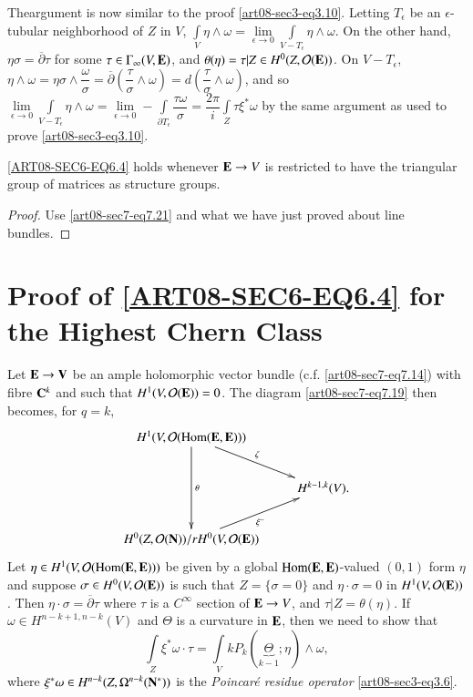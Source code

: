 The\pageoriginale argument is now similar to the proof \eqref{art08-sec3-eq3.10}. Letting $T_{\epsilon}$ be an $\epsilon$-tubular neighborhood of $Z$ in $V$, $\int\limits_{V}\eta\wedge \omega=\lim\limits_{\epsilon\to 0}\int\limits_{V-T_{\epsilon}}\eta\wedge \omega$. On the other hand, $\eta\sigma=\overline{\partial}\tau$ for some $\tau\in \Gamma_{\infty}(V,\mathbf{E})$, and $\theta(\eta)=\tau|Z\in H^{0}(Z,\mathcal{O}(\mathbf{E}))$. On $V-T_{\epsilon}$, $\eta\wedge \omega=\eta\sigma\wedge\dfrac{\omega}{\sigma}=\overline{\partial}\left(\dfrac{\tau}{\sigma}\wedge\omega\right)=d\left(\dfrac{\tau}{\sigma}\wedge\omega\right)$, and so $\lim\limits_{\epsilon\to 0}\int\limits_{V-T_{\epsilon}}\eta\wedge\omega=\lim\limits_{\epsilon\to 0}-\int\limits_{\partial T_{\epsilon}}\dfrac{\tau\omega}{\sigma}=\dfrac{2\pi}{i}\int\limits_{Z}\tau\xi^{*}\omega$ by the same argument as used to prove \eqref{art08-sec3-eq3.10}.

\setcounter{theorem}{26}
\begin{corollary}
\eqref{ART08-SEC6-EQ6.4} holds whenever $\mathbf{E}\to V$ is restricted to have the triangular group of matrices as structure groups.
\end{corollary}

\begin{proof}
Use \eqref{art08-sec7-eq7.21} and what we have just proved about line bundles.
\end{proof}

\section{Proof of \texorpdfstring{\eqref{ART08-SEC6-EQ6.4}}{eq6.4} for the Highest Chern Class}\label{art08-sec8}

Let $\mathbf{E}\to \mathbf{V}$ be an ample holomorphic vector bundle (c.f. \eqref{art08-sec7-eq7.14}) with fibre $\mathbf{C}^{k}$ and such that $H^{1}(V,\mathcal{O}(\mathbf{E}))=0$. The diagram \eqref{art08-sec7-eq7.19} then becomes, for $q=k$,
\setcounter{equation}{0}
\begin{equation}
\vcenter{\xymatrix{
H^{1}(V,\mathcal{O}(\Hom(\bfE,\bfE)))\ar[dd]^-{\theta}\ar[dr]^-{\zeta}\\
               & H^{k-1,k}(V).\\
H^{0}(Z,\mathcal{O}(\bfN))/rH^{0}(V,\mathcal{O}(\bfE))\ar[ur]_{\xi^{-}} &
}}\label{art08-sec8-eq8.1}
\end{equation}
Let $\eta\in H^{1}(V,\mathcal{O}(\operatorname{\mathrm{Hom}}(\mathbf{E},\mathbf{E})))$ be given by a global $\operatorname{\mathrm{Hom}}(\mathbf{E},\mathbf{E})$-valued $(0,1)$ form $\eta$ and suppose $\sigma\in H^{0}(V,\mathcal{O}(\mathbf{E}))$ is such that $Z=\{\sigma=0\}$ and $\eta\cdot \sigma=0$ in $H^{1}(V,\mathcal{O}(\mathbf{E}))$. Then $\eta\cdot \sigma=\overline{\partial}\tau$ where $\tau$ is a $C^{\infty}$ section of $\mathbf{E}\to V$, and $\tau|Z=\theta(\eta)$. If $\omega\in H^{n-k+1,n-k}(V)$ and $\Theta$ is a curvature in $\mathbf{E}$, then we need to show that
\begin{equation}
\int\limits_{Z}\xi^{*}\omega\cdot \tau = \int\limits_{V}kP_{k}(\underbrace{\Theta}_{k-1};\eta)\wedge\omega,\label{art08-sec8-eq8.2}
\end{equation}
where $\xi^{*}\omega\in H^{n-k}(Z,\Omega^{n-k}(\mathbf{N}^{*}))$ is the {\em Poincar\'e residue operator} \eqref{art08-sec3-eq3.6}.


